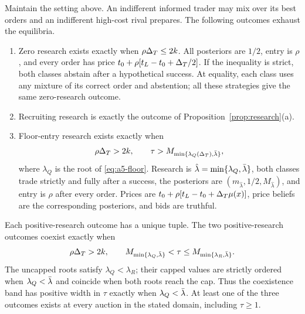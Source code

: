 \begin{lemma}\label{lem:a5-outcomes}
Maintain the setting above. An indifferent informed trader may mix over its best orders and an indifferent high-cost
rival prepares. The following outcomes exhaust the equilibria.
\begin{enumerate}[label=(\alph*),leftmargin=2em]
\item Zero research exists exactly when \(\rho\Delta_T\le2k\). All posteriors are \(1/2\), entry is \(\rho\), and
every order has price \(t_0+\rho[t_L-t_0+\Delta_T/2]\). If the inequality is strict, both classes abstain after a
hypothetical success. At equality, each class uses any mixture of its correct order and abstention; all these
strategies give the same zero-research outcome.
\item Recruiting research is exactly the outcome of Proposition~\ref{prop:research}(a).
\item Floor-entry research exists exactly when
\[
 \rho\Delta_T>2k,\qquad \tau>M_{\min\{\lambda_Q(\Delta_T),\bar\lambda\}},
\]
where \(\lambda_Q\) is the root of \eqref{eq:a5-floor}.
Research is \(\hat\lambda=\min\{\lambda_Q,\bar\lambda\}\), both classes trade strictly and fully after a success, the
posteriors are \((m_{\hat\lambda},1/2,M_{\hat\lambda})\), and entry is \(\rho\) after every order. Prices are
\(t_0+\rho[t_L-t_0+\Delta_T\mu(x)]\), price beliefs are the corresponding posteriors, and bids are truthful.
\end{enumerate}
Each positive-research outcome has a unique tuple. The two positive-research outcomes coexist exactly when
\[
 \rho\Delta_T>2k,\qquad
 M_{\min\{\lambda_Q,\bar\lambda\}}<\tau\le M_{\min\{\lambda_R,\bar\lambda\}}.
\]
The uncapped roots satisfy \(\lambda_Q<\lambda_R\); their capped values are strictly ordered when
\(\lambda_Q<\bar\lambda\) and coincide when both roots reach the cap. Thus the coexistence band has positive width in
\(\tau\) exactly when \(\lambda_Q<\bar\lambda\). At least one of the three outcomes exists at every auction in the
stated domain, including \(\tau\ge1\).
\end{lemma}

